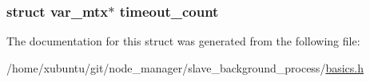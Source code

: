 \subsubsection[{timeout\+\_\+count}]{\setlength{\rightskip}{0pt plus 5cm}struct {\bf var\+\_\+mtx}$\ast$ timeout\+\_\+count}\label{structslave__args_add28ebd6d6bfc427a68f158adda7f98b}


The documentation for this struct was generated from the following file\+:\begin{DoxyCompactItemize}
\item 
/home/xubuntu/git/node\+\_\+manager/slave\+\_\+background\+\_\+process/\hyperlink{basics_8h}{basics.\+h}\end{DoxyCompactItemize}
